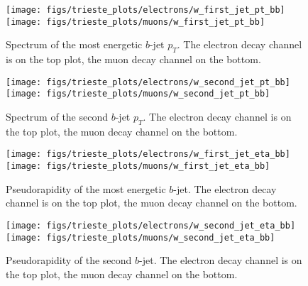 \begin{figure}[htb]
        \begin{center}
                \leavevmode
                \texttt{[image: figs/trieste\_plots/electrons/w\_first\_jet\_pt\_bb]}
                \texttt{[image: figs/trieste\_plots/muons/w\_first\_jet\_pt\_bb]}
        \end{center}
        \caption{Spectrum of the most energetic $b$-jet $p_{T}$.
          The electron decay channel is on the top plot,
          the muon decay channel on the bottom.}
        \label{fig:1stjetpt}
\end{figure}

\begin{figure}[htb]
        \begin{center}
                \leavevmode
                \texttt{[image: figs/trieste\_plots/electrons/w\_second\_jet\_pt\_bb]}
                \texttt{[image: figs/trieste\_plots/muons/w\_second\_jet\_pt\_bb]}
        \end{center}
        \caption{Spectrum of the second $b$-jet $p_{T}$.
          The electron decay channel is on the top plot,
          the muon decay channel on the bottom.}
        \label{fig:2ndjetpt}
\end{figure}

\begin{figure}[htb]
        \begin{center}
                \leavevmode
                \texttt{[image: figs/trieste\_plots/electrons/w\_first\_jet\_eta\_bb]}
                \texttt{[image: figs/trieste\_plots/muons/w\_first\_jet\_eta\_bb]}
        \end{center}
        \caption{Pseudorapidity of the most energetic $b$-jet.
          The electron decay channel is on the top plot,
          the muon decay channel on the bottom.}
        \label{fig:1stjeteta}
\end{figure}

\begin{figure}[htb]
        \begin{center}
                \leavevmode
                \texttt{[image: figs/trieste\_plots/electrons/w\_second\_jet\_eta\_bb]}
                \texttt{[image: figs/trieste\_plots/muons/w\_second\_jet\_eta\_bb]}
        \end{center}
        \caption{Pseudorapidity of the second $b$-jet.
          The electron decay channel is on the top plot,
          the muon decay channel on the bottom.}
        \label{fig:2ndjeteta}
\end{figure}

